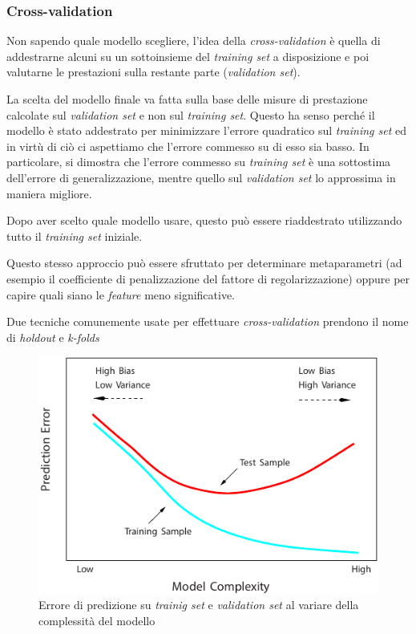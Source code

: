 \subsubsection{Cross-validation}

Non sapendo quale modello scegliere, l'idea della \emph{cross-validation} è quella di addestrarne alcuni su un sottoinsieme del \emph{training set} a disposizione e poi valutarne le prestazioni sulla restante parte (\emph{validation set}).

La scelta del modello finale va fatta sulla base delle misure di prestazione calcolate sul \emph{validation set} e non sul \emph{training set}. Questo ha senso perché il modello è stato addestrato per minimizzare l'errore quadratico sul \emph{training set} ed in virtù di  ciò ci aspettiamo che l'errore commesso su di esso sia basso. In particolare, si dimostra che l'errore commesso su \emph{training set} è una sottostima dell'errore di generalizzazione, mentre quello sul \emph{validation set} lo approssima in maniera migliore.

Dopo aver scelto quale modello usare, questo può essere riaddestrato utilizzando tutto il \emph{training set} iniziale.

Questo stesso approccio può essere sfruttato per determinare metaparametri (ad esempio il coefficiente di penalizzazione del fattore di regolarizzazione) oppure per capire quali siano le \emph{feature} meno significative.

Due tecniche comunemente usate per effettuare \emph{cross-validation} prendono il nome di \emph{holdout} e \emph{k-folds}

\begin{figure}[]
\centering
  \includegraphics{images/bias_varianza}
  \caption{Errore di predizione su \emph{trainig set} e \emph{validation set} al variare della complessità del modello}
  \label{fig:bias_varianza}
\end{figure}

